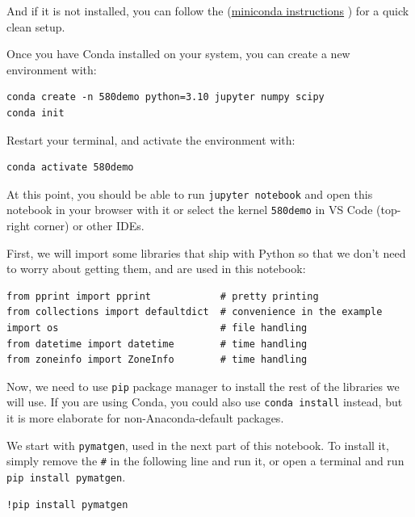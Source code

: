 And if it is not installed, you can follow the
(\href{https://docs.conda.io/en/latest/miniconda.html}{miniconda
instructions} ) for a quick clean setup.

Once you have Conda installed on your system, you can create a new
environment with:

\begin{verbatim}
conda create -n 580demo python=3.10 jupyter numpy scipy
conda init
\end{verbatim}

Restart your terminal, and activate the environment with:

\begin{verbatim}
conda activate 580demo
\end{verbatim}

At this point, you should be able to run
\texttt{jupyter notebook} and open this notebook in
your browser with it or select the kernel
\texttt{580demo} in VS Code (top-right corner) or other
IDEs.

First, we will import some libraries that ship with Python so that we
don't need to worry about getting them, and are used in this notebook:

\begin{verbatim}
from pprint import pprint            # pretty printing
from collections import defaultdict  # convenience in the example
import os                            # file handling
from datetime import datetime        # time handling
from zoneinfo import ZoneInfo        # time handling
\end{verbatim}

Now, we need to use \texttt{pip} package manager to
install the rest of the libraries we will use. If you are using Conda,
you could also use \texttt{conda install} instead, but
it is more elaborate for non-Anaconda-default packages.

We start with \texttt{pymatgen}, used in the next part
of this notebook. To install it, simply remove the
\texttt{\#} in the following line and run it, or open a
terminal and run \texttt{pip install pymatgen}.

\begin{verbatim}
!pip install pymatgen
\end{verbatim}

